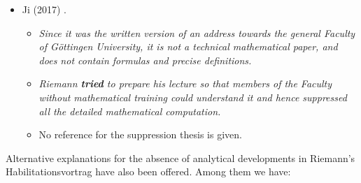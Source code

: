 \documentclass[12pt]{article}
\begin{document}
\begin{itemize}
\begin{itemize}
\item[$\bullet$]Dedekind (1876) \cite{Dedekind1876b}, Spivak (1970) \cite{Spivak1970}, Darrigol (2015) \cite{Darrigol2015}.

\end{itemize}

\item[$\bullet$]Ji (2017) \cite{Ji2017}.

\begin{itemize}

\item[]{\it Since it was the written version of an address towards the general Faculty of G\"ottingen University, it is not a technical mathematical paper, and does not contain formulas and precise definitions.}

\item[]{\it Riemann {\bf tried} to prepare his lecture so that members of the Faculty without mathematical training could understand it and hence suppressed all the detailed mathematical computation.}

\item[$\bullet$]No reference for the suppression thesis is given.

\end{itemize}

\end{itemize}

Alternative explanations for the absence of analytical developments in Riemann's Habilitationsvortrag have also been offered. Among them we have:
\end{document}
